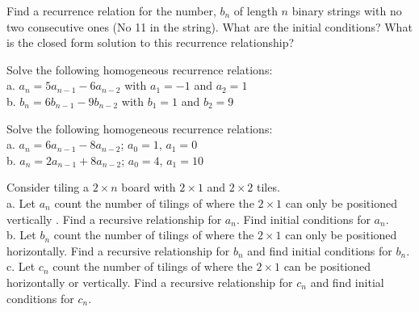 



\begin{exercise}
Find a recurrence relation for the number, $b_n$ of length $n$ binary strings with no two consecutive ones (No 11 in the string).  What are the initial conditions?  What is the closed form solution to this recurrence relationship?
\end{exercise}

\begin{exercise}
Solve the following homogeneous recurrence relations:\\
a. $a_n=5a_{n-1}-6a_{n-2}$ with $a_1=-1$ and $a_2=1$\\
b. $b_n=6b_{n-1}-9b_{n-2}$ with $b_1=1$ and $b_2=9$\\
\end{exercise}

\begin{exercise}
Solve the following homogeneous recurrence relations:\\
a. $a_n=6a_{n-1}-8a_{n-2}$; $a_0=1$, $a_1=0$\\
b. $a_n=2a_{n-1}+8a_{n-2}$; $a_0=4$, $a_1=10$
\end{exercise}

\begin{exercise}
Consider tiling a $2 \times n$ board with $2 \times 1$ and $2 \times 2$ tiles.\\
a. Let $a_n$ count the number of tilings of where the $2 \times 1$ can only be positioned vertically .  Find a recursive relationship for $a_n$. Find initial conditions for $a_n$.\\
b. Let $b_n$ count the number of tilings of where the $2 \times 1$ can only be positioned horizontally. Find a recursive relationship for $b_n$ and find initial conditions for $b_n$.\\
c. Let $c_n$ count the number of tilings of where the $2 \times 1$ can  be positioned horizontally or vertically.  Find a recursive relationship for $c_n$ and find initial conditions for $c_n$.
\end{exercise}


